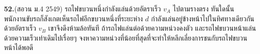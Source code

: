 \par\noindent\textbf{52.}\quad (สอวน ม.4 2549) รถไฟขบวนหนึ่งกำลังแล่นด้วยอัตราเร็ว $v_A$ ไปตามรางตรง ทันใดนั้นพนักงานขับรถก็สังเกตเห็นรถไฟอีกขบวนหนึ่งที่ระยะห่าง $d$ กำลังแล่นอยู่ข้างหน้าไปในทิศทางเดียวกันด้วยอัตราเร็ว $v_B$ เขาจึงดึงห้ามล้อทันที ถ้ารถไฟแล่นต่อด้วยความหน่วงคงตัว และรถไฟขบวนหน้าแล่นด้วยความเร็วเท่าเดิมไปเรื่อยๆ จงหาความหน่วงที่น้อยที่สุดที่จะทำให้หลีกเลี่ยงการชนกับรถไฟขบวนหน้าได้พอดี\par\medskip
